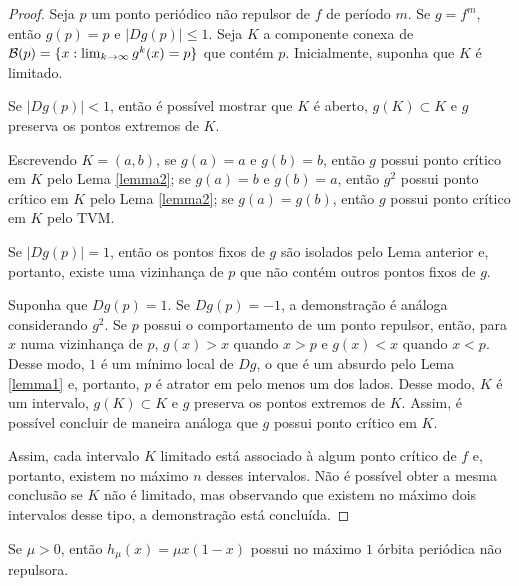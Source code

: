 \begin{proof}
Seja $p$ um ponto periódico não repulsor de $f$ de período $m$.
Se $g = f^m$, então $g(p) = p$ e $|D g(p)| \leq 1$.
Seja $K$ a componente conexa de $\mathcal{B}(p) = \lbrace x : \lim_{k \to \infty} g^k(x) = p \rbrace$ que contém $p$.
Inicialmente, suponha que $K$ é limitado.

Se $|D g(p)| < 1$, então é possível mostrar que $K$ é aberto, $g(K) \subset K$ e $g$ preserva os pontos extremos de $K$.

Escrevendo $K = (a, b)$, se $g(a) = a$ e $g(b) = b$, então $g$ possui ponto crítico em $K$ pelo Lema \ref{lemma2}; se $g(a) = b$ e $g(b) = a$, então $g^2$ possui ponto crítico em $K$ pelo Lema \ref{lemma2}; se $g(a) = g(b)$, então $g$ possui ponto crítico em $K$ pelo TVM.

Se $|D g(p)| = 1$, então os pontos fixos de $g$ são isolados pelo Lema anterior e, portanto, existe uma vizinhança de $p$ que não contém outros pontos fixos de $g$.

Suponha que $D g(p) = 1$.
Se $D g(p) = -1$, a demonstração é análoga considerando $g^2$.
Se $p$ possui o comportamento de um ponto repulsor, então, para $x$ numa vizinhança de $p$, $g(x) > x$ quando $x > p$ e $g(x) < x$ quando $x < p$.
Desse modo, $1$ é um mínimo local de $D g$, o que é um absurdo pelo Lema \ref{lemma1} e, portanto, $p$ é atrator em pelo menos um dos lados.
Desse modo, $K$ é um intervalo, $g(K) \subset K$ e $g$ preserva os pontos extremos de $K$.
Assim, é possível concluir de maneira análoga que $g$ possui ponto crítico em $K$.

Assim, cada intervalo $K$ limitado está associado à algum ponto crítico de $f$ e, portanto, existem no máximo $n$ desses intervalos.
Não é possível obter a mesma conclusão se $K$ não é limitado, mas observando que existem no máximo dois intervalos desse tipo, a demonstração está concluída.
\end{proof}

\begin{corollary}
Se $\mu > 0$, então $h_\mu(x) = \mu x(1-x)$ possui no máximo $1$ órbita periódica não repulsora.
\end{corollary}
